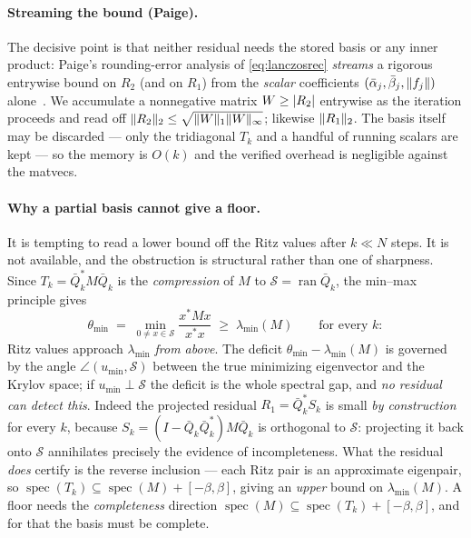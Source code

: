 \documentclass[11pt]{article}
\newcommand{\spec}{\operatorname{spec}}
\DeclarePairedDelimiter{\norm}{\lVert}{\rVert}
\DeclarePairedDelimiter{\abs}{\lvert}{\rvert}
\begin{document}
\paragraph{Streaming the bound (Paige).} The decisive point is that neither residual needs the stored
basis or any inner product: Paige's rounding-error analysis of \eqref{eq:lanczosrec} \emph{streams} a
rigorous entrywise bound on $R_2$ (and on $R_1$) from the \emph{scalar} coefficients
$(\bar\alpha_j,\bar\beta_j,\norm{f_j})$ alone~\cite{Paige1976,Rump2010}. We accumulate a nonnegative
matrix $W\ge\abs{R_2}$ entrywise as the iteration proceeds and read off
$\norm{R_2}_2\le\sqrt{\norm{W}_1\norm{W}_\infty}$; likewise $\norm{R_1}_2$. The basis itself may be
discarded --- only the tridiagonal $T_k$ and a handful of running scalars are kept --- so the memory is
$O(k)$ and the verified overhead is negligible against the matvecs.

\paragraph{Why a partial basis cannot give a floor.} It is tempting to read a lower bound off the
Ritz values after $k\ll N$ steps. It is not available, and the obstruction is structural rather than
one of sharpness. Since $T_k=\bar Q_k^*M\bar Q_k$ is the \emph{compression} of $M$ to
$\mathcal S=\operatorname{ran}\bar Q_k$, the min--max principle gives
\begin{equation}\label{eq:ritzabove}
  \theta_{\min}\;=\;\min_{0\ne x\in\mathcal S}\frac{x^*Mx}{x^*x}\;\ge\;\lambda_{\min}(M)
  \qquad\text{for every }k:
\end{equation}
Ritz values approach $\lambda_{\min}$ \emph{from above}. The deficit
$\theta_{\min}-\lambda_{\min}(M)$ is governed by the angle $\angle(u_{\min},\mathcal S)$ between the
true minimizing eigenvector and the Krylov space; if $u_{\min}\perp\mathcal S$ the deficit is the whole
spectral gap, and \emph{no residual can detect this}. Indeed the projected residual
$R_1=\bar Q_k^*S_k$ is small \emph{by construction} for every $k$, because
$S_k=(I-\bar Q_k\bar Q_k^*)M\bar Q_k$ is orthogonal to $\mathcal S$: projecting it back onto
$\mathcal S$ annihilates precisely the evidence of incompleteness. What the residual \emph{does}
certify is the reverse inclusion --- each Ritz pair is an approximate eigenpair, so
$\spec(T_k)\subseteq\spec(M)+[-\beta,\beta]$, giving an \emph{upper} bound on $\lambda_{\min}(M)$.
A floor needs the \emph{completeness} direction $\spec(M)\subseteq\spec(T_k)+[-\beta,\beta]$, and for
that the basis must be complete.
\end{document}

